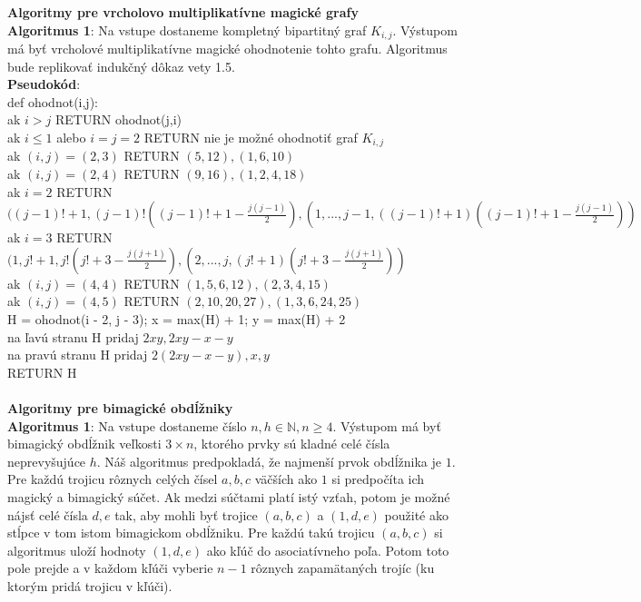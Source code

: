\documentclass[12pt]{article}
\begin{document}
\textbf{Algoritmy pre vrcholovo multiplikatívne magické grafy} \\

\textbf{Algoritmus 1}: Na vstupe dostaneme kompletný bipartitný graf $K_{i,j}$. Výstupom má byť vrcholové multiplikatívne magické ohodnotenie tohto grafu. Algoritmus bude replikovať indukčný dôkaz vety 1.5. \\

\textbf{Pseudokód}: \\
def ohodnot(i,j): \\
ak $i > j$ RETURN ohodnot(j,i) \\
ak $i \leq 1$ alebo $i = j = 2$ RETURN nie je možné ohodnotiť graf $K_{i,j}$ \\
ak $(i, j) = (2,3)$ RETURN $(5, 12), (1, 6, 10)$ \\
ak $(i, j) = (2,4)$ RETURN $(9, 16), (1, 2, 4, 18)$ \\
ak $i = 2$ RETURN $((j-1)! + 1, (j-1)! ((j-1)! + 1 - \frac{j(j-1)}{2}), (1, ... , j-1, ((j-1)! + 1) ((j-1)! + 1 - \frac{j(j-1)}{2}))$ \\
ak $i = 3$ RETURN $(1, j! + 1, j! (j! + 3 - \frac{j(j+1)}{2}), (2, ... , j, (j! + 1) (j! + 3 - \frac{j(j+1)}{2}))$ \\
ak $(i, j) = (4,4)$ RETURN $(1, 5, 6, 12), (2, 3, 4, 15)$ \\
ak $(i, j) = (4,5)$ RETURN $(2, 10, 20, 27), (1, 3, 6, 24, 25)$ \\
H = ohodnot(i - 2, j - 3); x = max(H) + 1; y = max(H) + 2 \\
na ľavú stranu H pridaj $2xy, 2xy - x - y$ \\
na pravú stranu H pridaj $2(2xy - x - y), x, y$ \\
RETURN H \\\\


\textbf{Algoritmy pre bimagické obdĺžniky} \\

\textbf{Algoritmus 1}: Na vstupe dostaneme číslo $n,h \in \mathbb{N}, n \geq 4$. Výstupom má byť bimagický obdĺžnik veľkosti $3 \times n$, ktorého prvky sú kladné celé čísla neprevyšujúce $h$. Náš algoritmus predpokladá, že najmenší prvok obdĺžnika je $1$. Pre každú trojicu rôznych celých čísel $a,b,c$ väčších ako $1$ si predpočíta ich magický a bimagický súčet. Ak medzi súčtami platí istý vzťah, potom je možné nájsť celé čísla $d,e$ tak, aby mohli byť trojice $(a,b,c)$ a $(1,d,e)$ použité ako stĺpce v tom istom bimagickom obdĺžniku. Pre každú takú trojicu $(a,b,c)$ si algoritmus uloží hodnoty $(1,d,e)$ ako kľúč do asociatívneho poľa. Potom toto pole prejde a v každom kľúči vyberie $n-1$ rôznych zapamätaných trojíc (ku ktorým pridá trojicu v kľúči). \\
\end{document}
